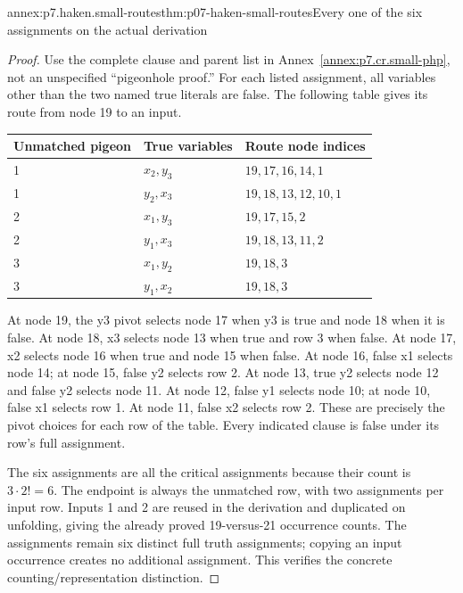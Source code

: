 \begin{annexitem}{annex:p7.haken.small-routes}{thm:p07-haken-small-routes}{Every one of the six assignments on the actual derivation}
\begin{proof}
Use the complete clause and parent list in
Annex~\ref{annex:p7.cr.small-php}, not an unspecified
``pigeonhole proof.'' For each listed assignment, all variables
other than the two named true literals are false. The following
table gives its route from node 19 to an input.
\begin{center}\small
\begin{tabular}{@{}lll@{}}
\toprule
Unmatched pigeon & True variables & Route node indices \\
\midrule
1 & \(x_2,y_3\) & \(19,17,16,14,1\) \\
1 & \(y_2,x_3\) & \(19,18,13,12,10,1\) \\
2 & \(x_1,y_3\) & \(19,17,15,2\) \\
2 & \(y_1,x_3\) & \(19,18,13,11,2\) \\
3 & \(x_1,y_2\) & \(19,18,3\) \\
3 & \(y_1,x_2\) & \(19,18,3\) \\
\bottomrule
\end{tabular}
\end{center}
At node 19, the y3 pivot selects node 17 when y3 is true and
node 18 when it is false. At node 18, x3 selects node 13 when
true and row 3 when false. At node 17, x2 selects node 16 when
true and node 15 when false. At node 16, false x1 selects
node 14; at node 15, false y2 selects row 2. At node 13, true
y2 selects node 12 and false y2 selects node 11. At node 12,
false y1 selects node 10; at node 10, false x1 selects row 1.
At node 11, false x2 selects row 2. These are precisely the
pivot choices for each row of the table. Every indicated
clause is false under its row's full assignment.

The six assignments are all the critical assignments because
their count is \(3\cdot2!=6\). The endpoint is always the
unmatched row, with two assignments per input row. Inputs 1
and 2 are reused in the derivation and duplicated on unfolding,
giving the already proved 19-versus-21 occurrence counts.
The assignments remain six distinct full truth assignments;
copying an input occurrence creates no additional assignment.
This verifies the concrete counting/representation distinction.
\end{proof}
\end{annexitem}
